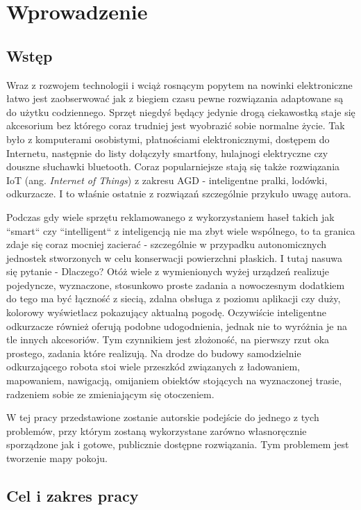 \chapter{Wprowadzenie}
\section{Wstęp}

Wraz z rozwojem technologii i wciąż rosnącym popytem na nowinki elektroniczne łatwo jest zaobserwować jak z biegiem czasu pewne rozwiązania adaptowane są do użytku codziennego. Sprzęt niegdyś będący jedynie drogą ciekawostką staje się akcesorium bez którego coraz trudniej jest wyobrazić sobie normalne życie. Tak było z komputerami osobistymi, płatnościami elektronicznymi, dostępem do Internetu, następnie do listy dołączyły smartfony, hulajnogi elektryczne czy douszne słuchawki bluetooth. Coraz popularniejsze stają się także rozwiązania IoT (ang. \emph{Internet of Things}) z zakresu AGD - inteligentne pralki, lodówki, odkurzacze. I to właśnie ostatnie z rozwiązań szczególnie przykuło uwagę autora. 

Podczas gdy wiele sprzętu reklamowanego z wykorzystaniem haseł takich jak ``smart`` czy ``intelligent`` z inteligencją nie ma zbyt wiele wspólnego, to ta granica zdaje się coraz mocniej zacierać - szczególnie w przypadku autonomicznych jednostek stworzonych w celu konserwacji powierzchni płaskich. I tutaj nasuwa się pytanie - Dlaczego? Otóż wiele z wymienionych wyżej urządzeń realizuje pojedyncze, wyznaczone, stosunkowo proste zadania a nowoczesnym dodatkiem do tego ma być łączność z siecią, zdalna obsługa z poziomu aplikacji czy duży, kolorowy wyświetlacz pokazujący aktualną pogodę. Oczywiście inteligentne odkurzacze również oferują podobne udogodnienia, jednak nie to wyróżnia je na tle innych akcesoriów. Tym czynnikiem jest złożoność, na pierwszy rzut oka prostego, zadania które realizują. Na drodze do budowy samodzielnie odkurzającego robota stoi wiele przeszkód związanych z ładowaniem, mapowaniem, nawigacją, omijaniem obiektów stojących na wyznaczonej trasie, radzeniem sobie ze zmieniającym się otoczeniem.

W tej pracy przedstawione zostanie autorskie podejście do jednego z tych problemów, przy którym zostaną wykorzystane zarówno własnoręcznie sporządzone jak i gotowe, publicznie dostępne rozwiązania. Tym problemem jest tworzenie mapy pokoju.

\section{Cel i zakres pracy}
